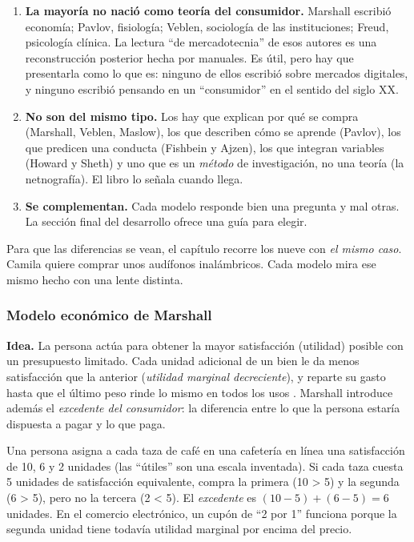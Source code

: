\begin{enumerate}
  \item \textbf{La mayoría no nació como teoría del consumidor.} Marshall
  escribió economía; Pavlov, fisiología; Veblen, sociología de las
  instituciones; Freud, psicología clínica. La lectura \enquote{de
  mercadotecnia} de esos autores es una reconstrucción posterior hecha por
  manuales. Es útil, pero hay que presentarla como lo que es: ninguno de ellos
  escribió sobre mercados digitales, y ninguno escribió pensando en un
  \enquote{consumidor} en el sentido del siglo XX.
  \item \textbf{No son del mismo tipo.} Los hay que explican por qué se compra
  (Marshall, Veblen, Maslow), los que describen cómo se aprende (Pavlov), los
  que predicen una conducta (Fishbein y Ajzen), los que integran variables
  (Howard y Sheth) y uno que es un \emph{método} de investigación, no una
  teoría (la netnografía). El libro lo señala cuando llega.
  \item \textbf{Se complementan.} Cada modelo responde bien una pregunta
  y mal otras. La sección final del desarrollo ofrece una guía para elegir.
\end{enumerate}

Para que las diferencias se vean, el capítulo recorre los nueve con \emph{el mismo
caso}. Camila quiere comprar unos audífonos inalámbricos. Cada modelo mira ese
mismo hecho con una lente distinta.

\subsubsection{Modelo económico de Marshall}
\label{sec:cap09-marshall}

\textbf{Idea.} La persona actúa para obtener la mayor satisfacción (utilidad)
posible con un presupuesto limitado. Cada unidad adicional de un bien le da
menos satisfacción que la anterior (\emph{utilidad marginal decreciente}), y
reparte su gasto hasta que el último peso rinde lo mismo en todos los usos
\parencite{marshall1890}. Marshall introduce además el \emph{excedente del
consumidor}: la diferencia entre lo que la persona estaría dispuesta a pagar y lo
que paga.

\begin{cajaEjemplo}[title={Ejemplo 1: utilidad marginal y la tercera taza}]
Una persona asigna a cada taza de café en una cafetería en línea una
satisfacción de 10, 6 y 2 unidades (las \enquote{útiles} son una escala
inventada). Si cada taza cuesta 5 unidades de satisfacción equivalente, compra la
primera (10 > 5) y la segunda (6 > 5), pero no la tercera (2 < 5). El
\emph{excedente} es $(10-5)+(6-5)=6$ unidades. En el comercio electrónico, un
cupón de \enquote{2 por 1} funciona porque la segunda unidad tiene todavía
utilidad marginal por encima del precio.
\end{cajaEjemplo}

